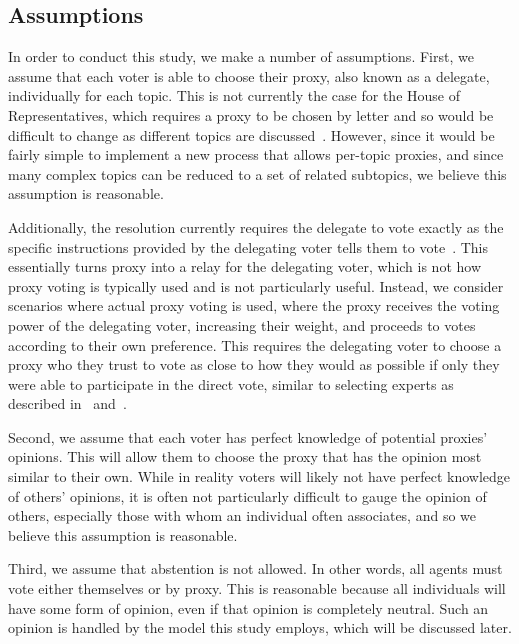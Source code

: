 \subsection{Assumptions}\label{subsec:assumptions}
In order to conduct this study, we make a number of assumptions.
First, we assume that each voter is able to choose their proxy, also known as a
delegate, individually for each topic.
This is not currently the case for the House of Representatives, which requires
a proxy to be chosen by letter and so would be difficult to change as different
topics are discussed~\cite{Congress.gov2020}.
However, since it would be fairly simple to implement a new process that allows
per-topic proxies, and since many complex topics can be reduced to a set of related
subtopics, we believe this assumption is reasonable.

Additionally, the resolution currently requires the delegate to vote exactly as the
specific instructions provided by the delegating voter tells them to
vote~\cite{CERP2020, Congress.gov2020}.
This essentially turns proxy into a relay for the delegating voter, which is not how
proxy voting is typically used and is not particularly useful. 
Instead, we consider scenarios where actual proxy voting is used, where the proxy
receives the voting power of the delegating voter, increasing their weight, and
proceeds to votes according to their own preference.
This requires the delegating voter to choose a proxy who they trust to vote as close
to how they would as possible if only they were able to participate in the direct vote,
similar to selecting experts as described in~\cite{Miller1969} and~\cite{Mueller1972}.

Second, we assume that each voter has perfect knowledge of potential proxies' opinions.
This will allow them to choose the proxy that has the opinion most similar to their own.
While in reality voters will likely not have perfect knowledge of others' opinions,
it is often not particularly difficult to gauge the opinion of others, especially
those with whom an individual often associates, and so we believe this assumption is
reasonable.

Third, we assume that abstention is not allowed.
In other words, all agents must vote either themselves or by proxy.
This is reasonable because all individuals will have some form of opinion, even if
that opinion is completely neutral.
Such an opinion is handled by the model this study employs, which will be discussed
later.


